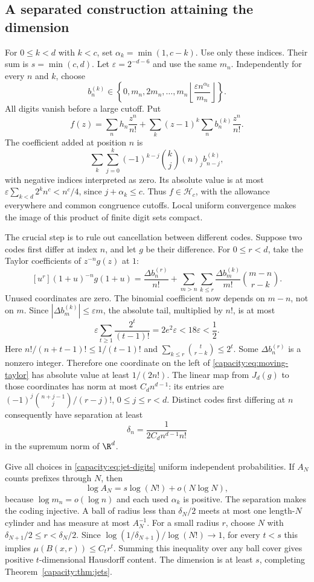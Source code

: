 \documentclass[11pt]{article}
\begin{document}
\subsection{A separated construction attaining the dimension}
For $0\le k<d$ with $k<c$, set $\alpha_k=\min(1,c-k)$. Use only these
indices. Their sum is $s=\min(c,d)$. Let $\varepsilon=2^{-d-6}$ and use
the same $m_n$. Independently for every $n$ and $k$, choose
\[
 b_n^{(k)}\in\left\{0,m_n,2m_n,\ldots,
 m_n\left\lfloor\frac{\varepsilon n^{\alpha_k}}{m_n}\right\rfloor\right\}.
 \tag{D}\label{capacity:eq:jet-digits}
\]
All digits vanish before a large cutoff. Put
\[
 f(z)=\sum_n h_n\frac{z^n}{n!}
       +\sum_k(z-1)^k\sum_n b_n^{(k)}\frac{z^n}{n!}.
 \tag{F}\label{capacity:eq:jet-code}
\]
The coefficient added at position $n$ is
\[
 \sum_k\sum_{j=0}^k(-1)^{k-j}\binom{k}{j}(n)_j b_{n-j}^{(k)},
\]
with negative indices interpreted as zero. Its absolute value is at most
$\varepsilon\sum_{k<d}2^k n^c<n^c/4$, since $j+\alpha_k\le c$.
Thus $f\in\mathcal H_c$, with the allowance everywhere and common
congruence cutoffs. Local uniform convergence makes the image of this
product of finite digit sets compact.

The crucial step is to rule out cancellation between different codes.
Suppose two codes first differ at index $n$, and let $g$ be their difference.
For $0\le r<d$, take the Taylor coefficients of $z^{-n}g(z)$ at $1$:
\[
 [u^r](1+u)^{-n}g(1+u)
 =\frac{\Delta b_n^{(r)}}{n!}
   +\sum_{m>n}\sum_{k\le r}
       \frac{\Delta b_m^{(k)}}{m!}\binom{m-n}{r-k}.
 \tag{T}\label{capacity:eq:moving-taylor}
\]
Unused coordinates are zero. The binomial coefficient now depends on
$m-n$, not on $m$. Since $|\Delta b_m^{(k)}|\le\varepsilon m$, the
absolute tail, multiplied by $n!$, is at most
\[
 \varepsilon\sum_{t\ge1}\frac{2^t}{(t-1)!}
 =2e^2\varepsilon<18\varepsilon<\frac12.
\]
Here $n!/(n+t-1)!\le1/(t-1)!$ and
$\sum_{k\le r}\binom{t}{r-k}\le2^t$. Some $\Delta b_n^{(r)}$ is a
nonzero integer. Therefore one coordinate on the left of
\eqref{capacity:eq:moving-taylor} has absolute value at least $1/(2n!)$.
The linear map from $J_d(g)$ to those coordinates has norm at most
$C_dn^{d-1}$: its entries are
$(-1)^j\binom{n+j-1}{j}/(r-j)!$, $0\le j\le r<d$.
Distinct codes first differing at $n$ consequently have separation at least
\[
 \delta_n=\frac{1}{2C_dn^{d-1}n!}
 \tag{S}\label{capacity:eq:jet-separation}
\]
in the supremum norm of $\R^d$.

Give all choices in \eqref{capacity:eq:jet-digits} uniform independent
probabilities. If $A_N$ counts prefixes through $N$, then
\[
 \log A_N=s\log(N!)+o(N\log N),
\]
because $\log m_n=o(\log n)$ and each used $\alpha_k$ is positive.
The separation makes the coding injective. A ball of radius less than
$\delta_N/2$ meets at most one length-$N$ cylinder and has measure at most
$A_N^{-1}$. For a small radius $r$, choose $N$ with
$\delta_{N+1}/2\le r<\delta_N/2$. Since
$\log(1/\delta_{N+1})/\log(N!)\to1$, for every $t<s$ this implies
$\mu(B(x,r))\le C_t r^t$. Summing this inequality over any ball cover
gives positive $t$-dimensional Hausdorff content. The dimension is at least
$s$, completing Theorem~\ref{capacity:thm:jets}.
\end{document}
